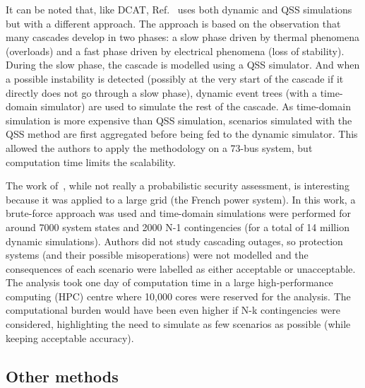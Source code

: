 
It can be noted that, like DCAT, Ref.~\cite{PierreIEEEtran} uses both dynamic and QSS simulations but with a different approach. The approach is based on the observation that many cascades develop in two phases: a slow phase driven by thermal phenomena (overloads) and a fast phase driven by electrical phenomena (loss of stability). During the slow phase, the cascade is modelled using a QSS simulator. And when a possible instability is detected (possibly at the very start of the cascade if it directly does not go through a slow phase), dynamic event trees (with a time-domain simulator) are used to simulate the rest of the cascade. As time-domain simulation is more expensive than QSS simulation, scenarios simulated with the QSS method are first aggregated before being fed to the dynamic simulator. This allowed the authors to apply the methodology on a 73-bus system, but computation time limits the scalability.

The work of~\cite{EurostagHPC}, while not really a probabilistic security assessment, is interesting because it was applied to a large grid (the French power system). In this work, a brute-force approach was used and time-domain simulations were performed for around 7000 system states and 2000 N-1 contingencies (for a total of 14 million dynamic simulations). Authors did not study cascading outages, so protection systems (and their possible misoperations) were not modelled and the consequences of each scenario were labelled as either acceptable or unacceptable. The analysis took one day of computation time in a large high-performance computing (HPC) centre where 10,000 cores were reserved for the analysis. The computational burden would have been even higher if N-k contingencies were considered, highlighting the need to simulate as few scenarios as possible (while keeping acceptable accuracy).



\subsection{Other methods}
\label{sec:OtherMethods}

